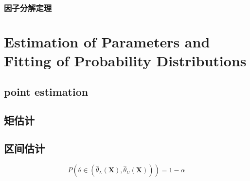 \documentclass[cn,11pt,chinese,black]{elegantbook}
\begin{document}
\subsection{因子分解定理}
\chapter{Estimation of Parameters	and Fitting of Probability	Distributions}
\section{point estimation}
\section{矩估计}
\section{区间估计}
$$P\left(\theta \in\left(\hat{\theta}_{L}(\mathbf{X}), \hat{\theta}_{U}(\mathbf{X})\right)\right)=1-\alpha$$
\end{document}

